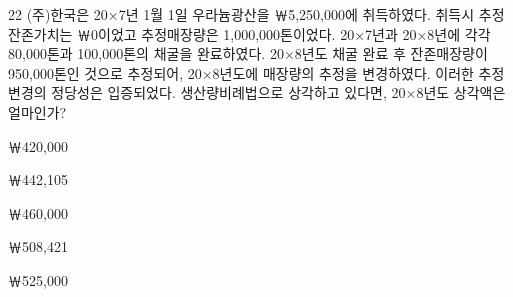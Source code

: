 \begin{question}{22}
(주)한국은 20×7년 1월 1일 우라늄광산을 ￦5,250,000에 취득하였다. 취득시 추정잔존가치는 ￦0이었고 추정매장량은 1,000,000톤이었다. 20×7년과 20×8년에 각각 80,000톤과 100,000톤의 채굴을 완료하였다. 20×8년도 채굴 완료 후 잔존매장량이 950,000톤인 것으로 추정되어, 20×8년도에 매장량의 추정을 변경하였다. 이러한 추정변경의 정당성은 입증되었다. 생산량비례법으로 상각하고 있다면, 20×8년도 상각액은 얼마인가?
\begin{choices}
  \item ￦420,000
  \item ￦442,105
  \item ￦460,000
  \item ￦508,421
  \item ￦525,000
\end{choices}
\end{question}
